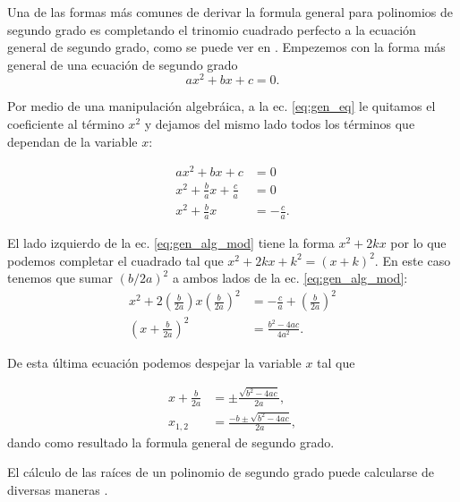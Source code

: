 \documentclass{article}
\begin{document}
  Una de las formas más comunes de derivar la formula general para polinomios de segundo grado es completando el trinomio cuadrado perfecto a la ecuación general de segundo grado, como se puede ver en \cite{rich2004schaum}. Empezemos con la forma más general de una ecuación de segundo grado
  \begin{equation}
    ax^2+bx+c = 0.
    \label{eq:gen_eq}
  \end{equation}

  Por medio de una manipulación algebráica, a la ec. \ref{eq:gen_eq} le quitamos el coeficiente al término $x^2$ y dejamos del mismo lado todos los términos que dependan de la variable $x$:

  \begin{align}
    ax^2+bx+c &=0\nonumber\\
    x^2+\frac{b}{a}x+\frac{c}{a}&=0\nonumber\\
    x^2 + \frac{b}{a}x &=-\frac{c}{a}.
  \label{eq:gen_alg_mod}
  \end{align} 

  El lado izquierdo de la ec. \ref{eq:gen_alg_mod} tiene la forma $ x^2+2kx $ por lo que podemos completar el cuadrado tal que $ x^2+2kx+k^2=(x+k)^2 $. En este caso tenemos que sumar $ (b/2a)^2 $ a ambos lados de la ec. \ref{eq:gen_alg_mod}:
  \begin{align}
    x^2 + 2 \left(\frac{b}{2a} \right)x\left(\frac{b}{2a} \right) ^2 &= -\frac{c}{a}+\left(\frac{b}{2a} \right)^2\nonumber\\
    \left(x+\frac{b}{2a} \right)^2 &= \frac{b^2-4ac}{4a^2}.
  \end{align}
  
  De esta última ecuación podemos despejar la variable $ x $ tal que

  \begin{align}
    x + \frac{b}{2a}&=\pm \frac{\sqrt{b^2-4ac}}{2a},\\
    x_{1,2} &= \frac{-b\pm\sqrt{b^2-4ac}}{2a},
  \end{align}
  dando como resultado la formula general de segundo grado.

  El cálculo de las raíces de un polinomio de segundo grado puede calcularse de diversas maneras \parencite{prasolov1997elliptic, goualard:hal-04116310}.

  \printbibliography
\end{document}
